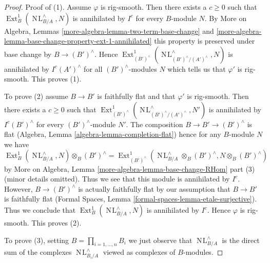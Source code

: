 \documentclass[10pt,a4paper]{amsart}
\theoremstyle{plain}
\theoremstyle{definition}
\theoremstyle{remark}
\numberwithin{equation}{subsection}
\def\Ext{\mathop{\mathrm{Ext}}\nolimits}
\def\NL{\mathop{N\!L}\nolimits}
\begin{document}
\begin{proof}
\medskip\noindent
Proof of (1). Assume $\varphi$ is rig-smooth. Then there exists a $c \geq 0$
such that $\Ext^1_B(\NL_{B/A}^\wedge, N)$ is annihilated by $I^c$
for every $B$-module $N$. By
More on Algebra, Lemmas \ref{more-algebra-lemma-two-term-base-change} and
\ref{more-algebra-lemma-base-change-property-ext-1-annihilated}
this property is preserved under base change by $B \to (B')^\wedge$.
Hence $\Ext^1_{(B')^\wedge}(\NL_{(B')^\wedge/(A')^\wedge}^\wedge, N)$
is annihilated by $I^c(A')^\wedge$ for all $(B')^\wedge$-modules $N$
which tells us that $\varphi'$ is rig-smooth.
This proves (1).

\medskip\noindent
To prove (2) assume $B \to B'$ is faithfully flat and that $\varphi'$
is rig-smooth. Then there exists a $c \geq 0$ such that
$\Ext^1_{(B')^\wedge}(\NL_{(B')^\wedge/(A')^\wedge}^\wedge, N')$
is annihilated by $I^c(B')^\wedge$ for every $(B')^\wedge$-module $N'$.
The composition $B \to B' \to (B')^\wedge$ is flat
(Algebra, Lemma \ref{algebra-lemma-completion-flat})
hence for any $B$-module $N$ we have
$$
\Ext^1_B(\NL_{B/A}^\wedge, N) \otimes_B (B')^\wedge =
\Ext^1_{(B')^\wedge}(\NL_{B/A}^\wedge \otimes_B (B')^\wedge,
N \otimes_B (B')^\wedge)
$$
by More on Algebra, Lemma \ref{more-algebra-lemma-base-change-RHom} part (3)
(minor details omitted). Thus we see that this module is annihilated
by $I^c$. However, $B \to (B')^\wedge$ is actually faithfully flat
by our assumption that $B \to B'$ is faithfully flat (Formal Spaces, Lemma
\ref{formal-spaces-lemma-etale-surjective}). Thus we conclude that
$\Ext^1_B(\NL_{B/A}^\wedge, N)$ is annihilated by $I^c$.
Hence $\varphi$ is rig-smooth. This proves (2).

\medskip\noindent
To prove (3), setting $B = \prod_{i = 1, \ldots, n} B_i$
we just observe that $\NL_{B/A}^\wedge$ is the direct
sum of the complexes $\NL_{B_i/A}^\wedge$ viewed as complexes
of $B$-modules.
\end{proof}
\end{document}
